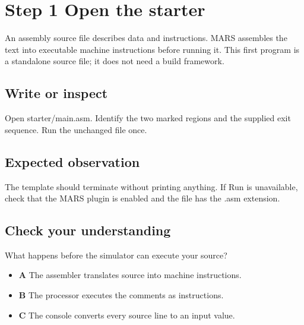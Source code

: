 \section{Step 1 Open the
  starter}\label{001-console-calculation-s01-step-1-open-the-starter}

An assembly source file describes data and instructions. MARS assembles
the text into executable machine instructions before running it. This
first program is a standalone source file; it does not need a build
framework.

\subsection{Write or
  inspect}\label{001-console-calculation-s01-write-or-inspect}

Open starter/main.asm. Identify the two marked regions and the supplied
exit sequence. Run the unchanged file once.

\subsection{Expected
  observation}\label{001-console-calculation-s01-expected-observation}

The template should terminate without printing anything. If Run is
unavailable, check that the MARS plugin is enabled and the file has the
.asm extension.

\subsection{Check your
  understanding}\label{001-console-calculation-s01-check-your-understanding}

What happens before the simulator can execute your source?

\begin{itemize}
  \tightlist
  \item
        \textbf{A} The assembler translates source into machine instructions.
  \item
        \textbf{B} The processor executes the comments as instructions.
  \item
        \textbf{C} The console converts every source line to an input value.
\end{itemize}
